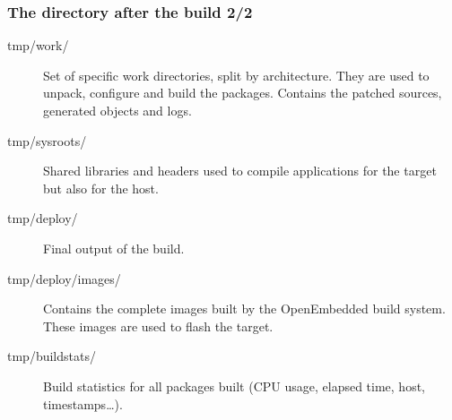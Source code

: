 \begin{frame}
  \frametitle{The  directory after the build 2/2}
  \begin{description}
    \item[tmp/work/] Set of specific work directories, split by
      architecture. They are used to unpack, configure and build the
      packages. Contains the patched sources, generated objects and
      logs.
    \item[tmp/sysroots/] Shared libraries and headers used to compile
      applications for the target but also for the host.
    \item[tmp/deploy/] Final output of the build.
    \item[tmp/deploy/images/] Contains the complete images built by
      the OpenEmbedded build system. These images are used to flash
      the target.
    \item[tmp/buildstats/] Build statistics for all packages built
      (CPU usage, elapsed time, host, timestamps\dots).
  \end{description}
\end{frame}
